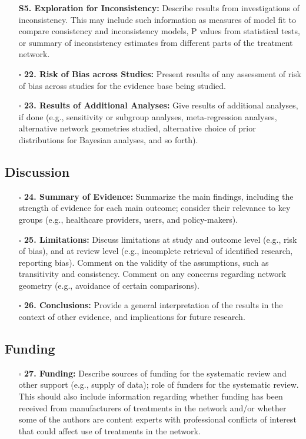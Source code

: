 \documentclass[11pt]{article}
\def\tightlist{}
\begin{document}
\begin{Form}
\begin{itemize}
  \textbf{S5. Exploration for Inconsistency:} Describe results from
  investigations of inconsistency. This may include such information as
  measures of model fit to compare consistency and inconsistency models,
  P values from statistical tests, or summary of inconsistency estimates
  from different parts of the treatment network.
\item[$\square$]
  \textbf{22. Risk of Bias across Studies:} Present results of any
  assessment of risk of bias across studies for the evidence base being
  studied.
\item[$\square$]
  \textbf{23. Results of Additional Analyses:} Give results of
  additional analyses, if done (e.g., sensitivity or subgroup analyses,
  meta-regression analyses, alternative network geometries studied,
  alternative choice of prior distributions for Bayesian analyses, and
  so forth).
\end{itemize}

\subsection{Discussion}\label{discussion}

\begin{itemize}
\tightlist
\item[$\square$]
  \textbf{24. Summary of Evidence:} Summarize the main findings,
  including the strength of evidence for each main outcome; consider
  their relevance to key groups (e.g., healthcare providers, users, and
  policy-makers).
\item[$\square$]
  \textbf{25. Limitations:} Discuss limitations at study and outcome
  level (e.g., risk of bias), and at review level (e.g., incomplete
  retrieval of identified research, reporting bias). Comment on the
  validity of the assumptions, such as transitivity and consistency.
  Comment on any concerns regarding network geometry (e.g., avoidance of
  certain comparisons).
\item[$\square$]
  \textbf{26. Conclusions:} Provide a general interpretation of the
  results in the context of other evidence, and implications for future
  research.
\end{itemize}

\subsection{Funding}\label{funding}

\begin{itemize}
\tightlist
\item[$\square$]
  \textbf{27. Funding:} Describe sources of funding for the systematic
  review and other support (e.g., supply of data); role of funders for
  the systematic review. This should also include information regarding
  whether funding has been received from manufacturers of treatments in
  the network and/or whether some of the authors are content experts
  with professional conflicts of interest that could affect use of
  treatments in the network.
\end{itemize}


\end{Form}
\end{document}
